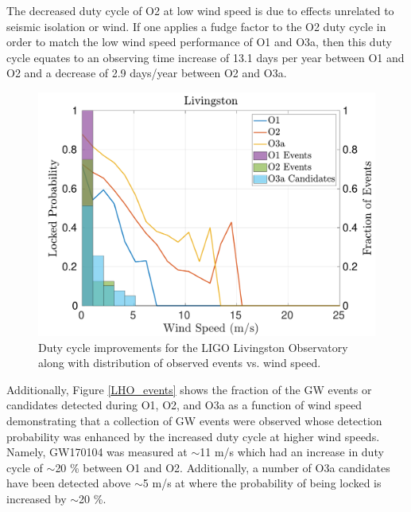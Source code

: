 \documentclass [12pt, proquest]{uwthesis}[2019]
\begin{document}
The decreased duty cycle of O2 at low wind speed is due to effects unrelated to seismic isolation or wind. If one applies a fudge factor to the O2 duty cycle in order to match the low wind speed performance of O1 and O3a, then this duty cycle equates to an observing time increase of 13.1 days per year between O1 and O2 and a decrease of 2.9 days/year between O2 and O3a.

\begin{figure}[!h]
\begin{center}
\includegraphics[width=\textwidth]{LLO_WindVsLockEvents.pdf}
\caption[Duty cycle improvements for the LIGO Livingston Observatory]{Duty cycle improvements for the LIGO Livingston Observatory along with distribution of observed events vs. wind speed.}
\label{LLO_events}
\end{center}
\end{figure}

Additionally, Figure \ref{LHO_events} shows the fraction of the GW events or candidates detected during O1, O2, and O3a as a function of wind speed demonstrating that a collection of GW events were observed whose detection probability was enhanced by the increased duty cycle at higher wind speeds. Namely, GW170104 was measured at $\sim$11 m/s which had an increase in duty cycle of $\sim$20 \% between O1 and O2. Additionally, a number of O3a candidates have been detected above $\sim$5 m/s at where the probability of being locked is increased by $\sim$20 \%.
\end{document}
